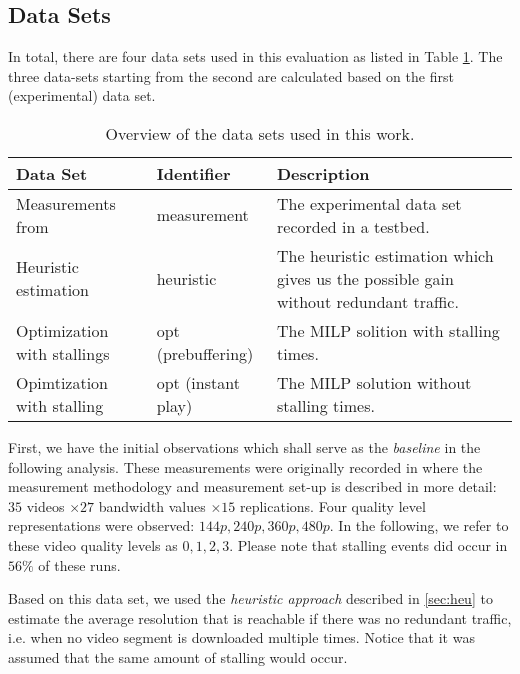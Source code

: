 
\subsection{Data Sets}
\label{sec:datasets}

In total, there are four data sets used in this evaluation as listed in Table \ref{tab:datasets}. The three data-sets starting from the second are calculated based on the first (experimental) data set.
\begin{table}
\caption{Overview of the data sets used in this work.}
\label{tab:datasets}
\centering
\begin{tabular}{p{2cm}p{2.3cm}p{3.2cm}}
\toprule
Data Set & Identifier & Description \\ 
\midrule 
Measurements from \cite{sieber16sacrificing} & measurement & The experimental data set recorded in a testbed. \\ 
\addlinespace
Heuristic estimation & heuristic & The heuristic estimation which gives us the possible gain without redundant traffic. \\ 
\addlinespace
Optimization with stallings & opt (prebuffering) & The MILP solition with stalling times. \\ 
\addlinespace
Opimtization with stalling & opt (instant play) & The MILP solution without stalling times. \\ 
\bottomrule
\end{tabular} 
\end{table}

First, we have the initial observations which shall serve as the \textit{baseline} in the following analysis. These measurements were originally recorded in \cite{sieber16sacrificing} where the measurement methodology and measurement set-up is described in more detail: $35$ videos $\times 27$ bandwidth values $\times 15$ replications. Four quality level representations were observed: $144p, 240p, 360p, 480p$. In the following, we refer to these video quality levels as $0,1,2,3$. Please note that stalling events did occur in $56\%$ of these runs.

Based on this data set, we used the \textit{heuristic approach} described in \ref{sec:heu} to estimate the average resolution that is reachable if there was no redundant traffic, i.e. when no video segment is downloaded multiple times. Notice that it was assumed that the same amount of stalling would occur.


